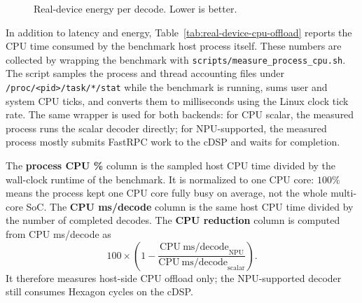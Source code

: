 \begin{figure}[h]
\centering
{}
\caption{Real-device energy per decode. Lower is better.}
\label{fig:real-device-energy}
\end{figure}

In addition to latency and energy, Table~\ref{tab:real-device-cpu-offload}
reports the CPU time consumed by the benchmark host process itself. These
numbers are collected by wrapping the benchmark with
\texttt{scripts/measure\_process\_cpu.sh}. The script samples the process and
thread accounting files under \texttt{/proc/<pid>/task/*/stat} while the
benchmark is running, sums user and system CPU ticks, and converts them to
milliseconds using the Linux clock tick rate. The same wrapper is used for both
backends: for CPU scalar, the measured process runs the scalar decoder directly;
for NPU-supported, the measured process mostly submits FastRPC work to the cDSP
and waits for completion.

The \textbf{process CPU \%} column is the sampled host CPU time divided by the
wall-clock runtime of the benchmark. It is normalized to one CPU core: \(100\%\)
means the process kept one CPU core fully busy on average, not the whole
multi-core SoC. The \textbf{CPU ms/decode} column is the same host CPU time
divided by the number of completed decodes. The \textbf{CPU reduction} column is
computed from CPU ms/decode as
\[
100 \times
\left(
1 -
\frac{\mathrm{CPU\ ms/decode}_{\mathrm{NPU}}}
     {\mathrm{CPU\ ms/decode}_{\mathrm{scalar}}}
\right).
\]
It therefore measures host-side CPU offload only; the NPU-supported decoder
still consumes Hexagon cycles on the cDSP.

